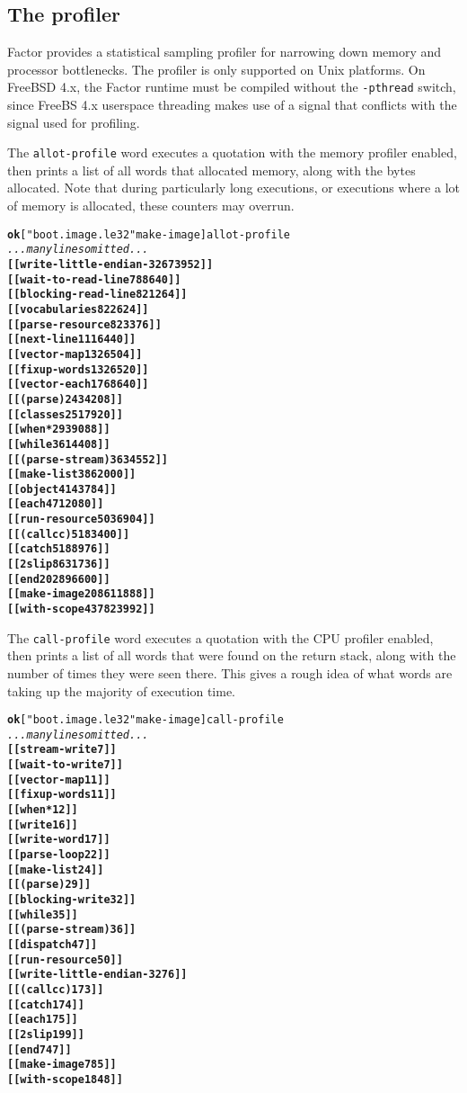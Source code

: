 \documentclass{book}
\begin{document}
\subsection{The profiler}

Factor provides a statistical sampling profiler for narrowing down memory and processor bottlenecks.
The profiler is only supported on Unix platforms. On FreeBSD 4.x, the Factor runtime must
be compiled without the \texttt{-pthread} switch, since FreeBS 4.x userspace threading makes
use of a signal that conflicts with the signal used for profiling.

The \texttt{allot-profile} word executes a quotation with the memory profiler enabled, then prints a list of all words that allocated memory, along with the bytes allocated. Note that during particularly long executions, or executions where a lot of memory is allocated, these counters may overrun.

\begin{alltt}
\textbf{ok} [ "boot.image.le32" make-image ] allot-profile
\emph{... many lines omitted ...}
\textbf{[[ write-little-endian-32 673952 ]]
[[ wait-to-read-line 788640 ]]
[[ blocking-read-line 821264 ]]
[[ vocabularies 822624 ]]
[[ parse-resource 823376 ]]
[[ next-line 1116440 ]]
[[ vector-map 1326504 ]]
[[ fixup-words 1326520 ]]
[[ vector-each 1768640 ]]
[[ (parse) 2434208 ]]
[[ classes 2517920 ]]
[[ when* 2939088 ]]
[[ while 3614408 ]]
[[ (parse-stream) 3634552 ]]
[[ make-list 3862000 ]]
[[ object 4143784 ]]
[[ each 4712080 ]]
[[ run-resource 5036904 ]]
[[ (callcc) 5183400 ]]
[[ catch 5188976 ]]
[[ 2slip 8631736 ]]
[[ end 202896600 ]]
[[ make-image 208611888 ]]
[[ with-scope 437823992 ]]}
\end{alltt}

The \texttt{call-profile} word executes a quotation with the CPU profiler enabled, then prints a list of all words that were found on the return stack, along with the number of times they were seen there. This gives a rough idea of what words are taking up the majority of execution time.

\begin{alltt}
\textbf{ok} [ "boot.image.le32" make-image ] call-profile
\emph{... many lines omitted ...}
\textbf{[[ stream-write 7 ]]
[[ wait-to-write 7 ]]
[[ vector-map 11 ]]
[[ fixup-words 11 ]]
[[ when* 12 ]]
[[ write 16 ]]
[[ write-word 17 ]]
[[ parse-loop 22 ]]
[[ make-list 24 ]]
[[ (parse) 29 ]]
[[ blocking-write 32 ]]
[[ while 35 ]]
[[ (parse-stream) 36 ]]
[[ dispatch 47 ]]
[[ run-resource 50 ]]
[[ write-little-endian-32 76 ]]
[[ (callcc) 173 ]]
[[ catch 174 ]]
[[ each 175 ]]
[[ 2slip 199 ]]
[[ end 747 ]]
[[ make-image 785 ]]
[[ with-scope 1848 ]]}
\end{alltt}
\end{document}

